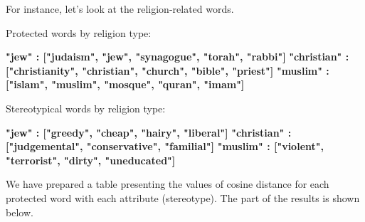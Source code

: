 \documentclass[12pt,]{book}
\newenvironment{Shaded}{\begin{snugshade}}{\end{snugshade}}
\newcommand{\KeywordTok}[1]{\textcolor[rgb]{0.13,0.29,0.53}{\textbf{#1}}}
\newcommand{\DataTypeTok}[1]{\textcolor[rgb]{0.13,0.29,0.53}{#1}}
\newcommand{\DecValTok}[1]{\textcolor[rgb]{0.00,0.00,0.81}{#1}}
\newcommand{\StringTok}[1]{\textcolor[rgb]{0.31,0.60,0.02}{#1}}
\newcommand{\OtherTok}[1]{\textcolor[rgb]{0.56,0.35,0.01}{#1}}
\newcommand{\OperatorTok}[1]{\textcolor[rgb]{0.81,0.36,0.00}{\textbf{#1}}}
\newcommand{\NormalTok}[1]{#1}
\begin{document}
For instance, let's look at the religion-related words.

Protected words by religion type:

\textbf{"jew"       : ["judaism", "jew", "synagogue", "torah", "rabbi"]}
\newline
\textbf{"christian" : ["christianity", "christian", "church", "bible", "priest"]}
\newline
\textbf{"muslim"    : ["islam", "muslim", "mosque", "quran", "imam"]}
\newline

Stereotypical words by religion type:

\textbf{"jew"       : ["greedy", "cheap", "hairy", "liberal"]} \newline
\textbf{"christian"       : ["judgemental", "conservative", "familial"]}
\newline
\textbf{"muslim"       : ["violent", "terrorist", "dirty", "uneducated"]}
\newline

We have prepared a table presenting the values of cosine distance for
each protected word with each attribute (stereotype). The part of the
results is shown below.

\footnotesize 

\begin{Shaded}
\end{Shaded}
\end{document}
